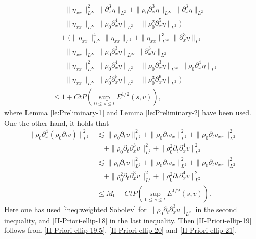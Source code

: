 \documentclass[11pt, reqno]{amsart}
\numberwithin{equation}{section}
\begin{document}
{\begin{equation}
\begin{aligned}
&\quad+\|\eta_{xx}\|_{L^\infty}^2\|\partial_x^3\eta\|_{L^2}+\|\rho_0\partial_x^3\eta\|_{L^\infty}\|\partial_x^3\eta\|_{L^2}\\
&\quad+\|\eta_{xx}\|_{L^\infty}\|\rho_0\partial_x^4\eta\|_{L^2}+\|\rho_0^2\partial_x^5\eta\|_{L^2})\\
&\quad+(\|\eta_{xx}\|_{L^\infty}^4\|\eta_{xx}\|_{L^2}+\|\eta_{xx}\|_{L^\infty}^3\|\partial_x^3\eta\|_{L^2}\\
&\quad+\|\eta_{xx}\|_{L^\infty}\|\rho_0\partial_x^3\eta\|_{L^\infty}\|\partial_x^3\eta\|_{L^2}\\
&\quad+\|\eta_{xx}\|_{L^\infty}^2\|\rho_0\partial_x^4\eta\|_{L^2}+\|\rho_0\partial_x^3\eta\|_{L^\infty}\|\rho_0\partial_x^4\eta\|_{L^2}\\
&\quad+\|\eta_{xx}\|_{L^\infty}\|\rho_0^2\partial_x^5\eta\|_{L^2}
+\|\rho_0^3\partial_x^6\eta\|_{L^2})\\
&\leq 1+Ct P(\sup_{0\leq s\leq t}E^{1/2}(s,v)),
\end{aligned}
\end{equation}
where Lemma \ref{le:Preliminary-1} and Lemma \ref{le:Preliminary-2} have been used.
One the other hand, it holds that
\begin{equation}\label{II-Priori-ellip-21}
\begin{aligned}
\|\rho_0\partial_x^4(\rho_0\partial_tv)\|_{L^2}^2
&\lesssim \|\rho_0\partial_tv\|_{L^2}^2+\|\rho_0\partial_tv_x\|_{L^2}^2
+\|\rho_0\partial_tv_{xx}\|_{L^2}^2\\
&\quad+\|\rho_0\partial_t\partial_x^3v\|_{L^2}^2+\|\rho_0^2\partial_t\partial_x^4v\|_{L^2}^2\\
&\lesssim \|\rho_0\partial_tv\|_{L^2}^2+\|\rho_0\partial_tv_x\|_{L^2}^2
+\|\rho_0\partial_tv_{xx}\|_{L^2}^2\\
&\quad+\|\rho_0^2\partial_t\partial_x^3v\|_{L^2}^2+\|\rho_0^2\partial_t\partial_x^4v\|_{L^2}^2\\
&\leq M_0+Ct P(\sup_{0\leq s\leq t}E^{1/2}(s,v)).
\end{aligned}
\end{equation}
Here one has used \eqref{ineq:weighted Sobolev} for \(\|\rho_0\partial_t\partial_x^3v\|_{L^2}\) in the second inequality, and \eqref{II-Priori-ellip-18} in the last inequality.
Then \eqref{II-Priori-ellip-19} follows from \eqref{II-Priori-ellip-19.5}, \eqref{II-Priori-ellip-20} and \eqref{II-Priori-ellip-21}.

}
\end{document}
